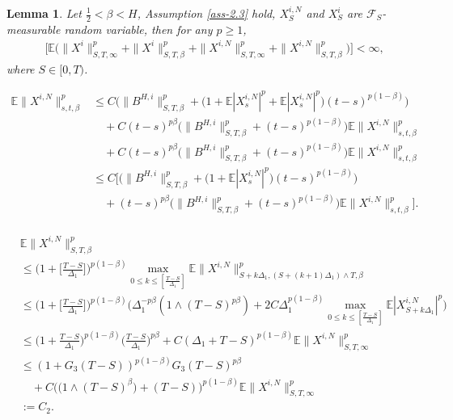 \documentclass[10pt,a4paper]{amsart}
\newtheorem{lemma}{Lemma}
\def\E{\mathbb E}
\def\F{\mathscr F}
\begin{document}
	\begin{lemma}\label{lem-3.2}
		Let $\frac{1}{2}<\beta<H$, Assumption \ref{ass-2.3} hold, $X^{i,N}_S$ and $X^i_S$ are $\F_S$-measurable random variable, then for any $p\geq 1$,
		\begin{equation}
			\begin{aligned}
				&\Big[\E\Big(\|X^i\|^p_{S,T,\infty}+\|X^i\|^p_{S,T,\beta}+\|X^{i,N}\|^p_{S,T,\infty}+\|X^{i,N}\|^p_{S,T,\beta}\Big)\Big]< \infty,
			\end{aligned}
		\end{equation}
		where $S\in [0,T)$.
	\end{lemma}

		\begin{equation}\label{eq-3.19}
			\begin{aligned}
				\E\|X^{i,N}\|^p_{s,t,\beta}&\leq C\Big(\|B^{H,i}\|^p_{S,T,\beta}+\big(1+\E|X^{i,N}_s|^p+\E|X^{i,N}_s|^p\big)(t-s)^{p(1-\beta)}\Big)\\
				&\quad+C(t-s)^{p\beta}\Big(\|B^{H,i}\|^p_{S,T,\beta}+(t-s)^{p(1-\beta)}\Big)\E\|X^{i,N}\|^p_{s,t,\beta}\\
				&\quad+C(t-s)^{p\beta}\Big(\|B^{H,i}\|^p_{S,T,\beta}+(t-s)^{p(1-\beta)}\Big)\E\|X^{i,N}\|^p_{s,t,\beta}\\
				&\leq C\Big[\Big(\|B^{H,i}\|^p_{S,T,\beta}+\big(1+\E|X^{i,N}_s|^p\big)(t-s)^{p(1-\beta)}\Big)\\
				&\quad+(t-s)^{p\beta}\Big(\|B^{H,i}\|^p_{S,T,\beta}+(t-s)^{p(1-\beta)}\Big)\E\|X^{i,N}\|^p_{s,t,\beta}\Big].\\
			\end{aligned}
		\end{equation}	

		\begin{equation}\label{eq-3.29}
			\begin{aligned}
				&\E\|X^{i,N}\|^p_{S,T,\beta}\\
				&\leq \Big(1+\big[\frac{T-S}{\Delta_1}\big]\Big)^{p(1-\beta)}\max_{0\leq k \leq [\frac{T-S}{\Delta_1}]}\E\|X^{i,N}\|^p_{S+k\Delta_1,(S+(k+1)\Delta_1)\wedge T,\beta}\\
				&\leq \Big(1+\big[\frac{T-S}{\Delta_1}\big]\Big)^{p(1-\beta)}\Big(\Delta_1^{-p\beta}(1\wedge (T-S)^{p\beta})+2C\Delta_1^{p(1-\beta)}\max_{0\leq k \leq [\frac{T-S}{\Delta_1}]}\E|X^{i,N}_{S+k\Delta_1}|^p\Big)\\
				&\leq \Big(1+\frac{T-S}{\Delta_1}\Big)^{p(1-\beta)}\Big(\frac{T-S}{\Delta_1}\Big)^{p\beta}+C(\Delta_1+T-S)^{p(1-\beta)}\E\|X^{i,N}\|^p_{S,T,\infty}\\
				&\leq (1+G_3(T-S))^{p(1-\beta)}G_3(T-S)^{p\beta}\\
				&\quad+C\Big(\big(1\wedge (T-S)^{\beta}\big)+(T-S)\Big)^{p(1-\beta)}\E\|X^{i,N}\|^p_{S,T,\infty}\\
				&:=C_2.
			\end{aligned}
		\end{equation}
\end{document}
